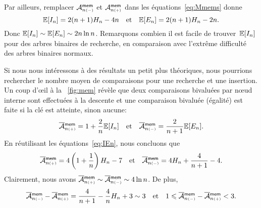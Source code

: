 Par ailleurs, remplacer \(\M{\fun{mem}}{n{\scriptscriptstyle
    (-)}}\) et \(\M{\fun{mem}}{n{\scriptscriptstyle (+)}}\) dans
les équations~\eqref{eq:Mmems} donne
\begin{equation}
\Expected{I_n} = 2(n+1)H_n - 4n
\quad\text{et}\quad
\Expected{E_n} = 2(n+1)H_n - 2n.
\label{eq:IEn}
\end{equation}
Donc \(\Expected{I_n} \sim \Expected{E_n} \sim 2n\ln n\). Remarquons
combien il est facile de trouver~\(\Expected{I_n}\) pour des arbres
binaires de recherche, en comparaison avec l'extrême difficulté des
arbres binaires normaux.

Si nous nous intéressons à des résultats un petit plus théoriques,
nous pourrions rechercher le nombre moyen de comparaisons pour une
recherche et une insertion. Un coup d'{\oe}il à la \fig~\vref{fig:mem}
révèle que deux comparaisons bivaluées par n{\oe}ud interne sont
effectuées à la descente et une comparaison bivaluée (égalité) est
faite si la clé est atteinte, sinon aucune:
\begin{equation}
\OM{\fun{mem}}{n{\scriptscriptstyle(+)}}
  = 1 + \frac{2}{n}\Expected{I_n}
\quad\text{et}\quad
\OM{\fun{mem}}{n{\scriptscriptstyle(-)}}
  = \frac{2}{n+1}\Expected{E_n}.
\label{eq:Mmem_cmp1}
\end{equation}
En réutilisant les équations~\eqref{eq:IEn}, nous concluons que
\begin{equation}
\OM{\fun{mem}}{n{\scriptscriptstyle(+)}}
  = 4\left(1+\frac{1}{n}\right)H_n - 7
\quad\text{et}\quad
\OM{\fun{mem}}{n{\scriptscriptstyle(-)}}
  = 4H_n + \frac{4}{n+1} - 4.
\index{mem@$\OM{\fun{mem}}{n{\scriptscriptstyle(-)}}$}
\index{mem@$\OM{\fun{mem}}{n{\scriptscriptstyle(+)}}$}
\label{eq:Mmem_cmp2}
\end{equation}
Clairement, nous avons \(\OM{\fun{mem}}{n{\scriptscriptstyle(+)}} \sim
\OM{\fun{mem}}{n{\scriptscriptstyle(-)}} \sim 4\ln n\). De plus,
\begin{equation*}
\OM{\fun{mem}}{n{\scriptscriptstyle (-)}} -
\OM{\fun{mem}}{n{\scriptscriptstyle (+)}} =
\frac{4}{n+1} - \frac{4}{n}H_n + 3 \sim 3
\quad\text{et}\quad
1 \leqslant \OM{\fun{mem}}{n{\scriptscriptstyle (-)}} -
\OM{\fun{mem}}{n{\scriptscriptstyle (+)}} < 3.
\end{equation*}

